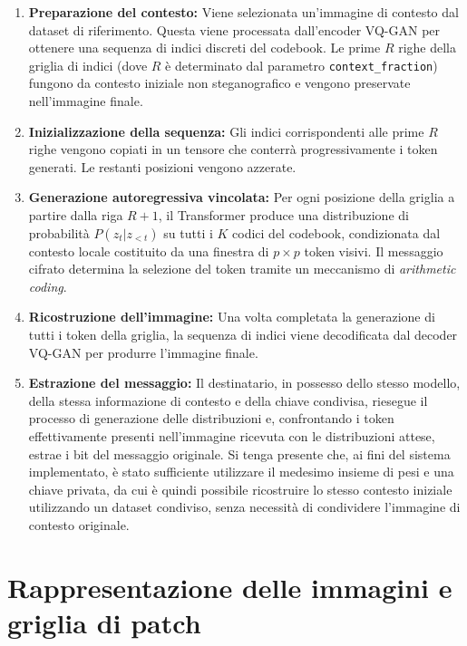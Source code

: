 \begin{enumerate}
	\item \textbf{Preparazione del contesto:} Viene selezionata un'immagine di contesto dal dataset di riferimento. Questa viene processata dall'encoder VQ-GAN per ottenere una sequenza di indici discreti del codebook. Le prime $R$ righe della griglia di indici (dove $R$ è determinato dal parametro \texttt{context\_fraction}) fungono da contesto iniziale non steganografico e vengono preservate nell'immagine finale.
	
	\item \textbf{Inizializzazione della sequenza:} Gli indici corrispondenti alle prime $R$ righe vengono copiati in un tensore che conterrà progressivamente i token generati. Le restanti posizioni vengono azzerate.
	
	\item \textbf{Generazione autoregressiva vincolata:} Per ogni posizione della griglia a partire dalla riga $R+1$, il Transformer produce una distribuzione di probabilità $P(z_t | z_{<t})$ su tutti i $K$ codici del codebook, condizionata dal contesto locale costituito da una finestra di $p \times p$ token visivi. Il messaggio cifrato determina la selezione del token tramite un meccanismo di \emph{arithmetic coding}.
	
	\item \textbf{Ricostruzione dell'immagine:} Una volta completata la generazione di tutti i token della griglia, la sequenza di indici viene decodificata dal decoder VQ-GAN per produrre l'immagine finale.
	
	\item \textbf{Estrazione del messaggio:} Il destinatario, in possesso dello stesso modello, della stessa informazione di contesto e della chiave condivisa, riesegue il processo di generazione delle distribuzioni e, confrontando i token effettivamente presenti nell'immagine ricevuta con le distribuzioni attese, estrae i bit del messaggio originale. Si tenga presente che, ai fini del sistema implementato, è stato sufficiente utilizzare il medesimo insieme di pesi e una chiave privata, da cui è quindi possibile ricostruire lo stesso contesto iniziale utilizzando un dataset condiviso, senza necessità di condividere l'immagine di contesto originale.
\end{enumerate}

\section{Rappresentazione delle immagini e griglia di patch}
\label{sec:rappresentazione-immagini}

